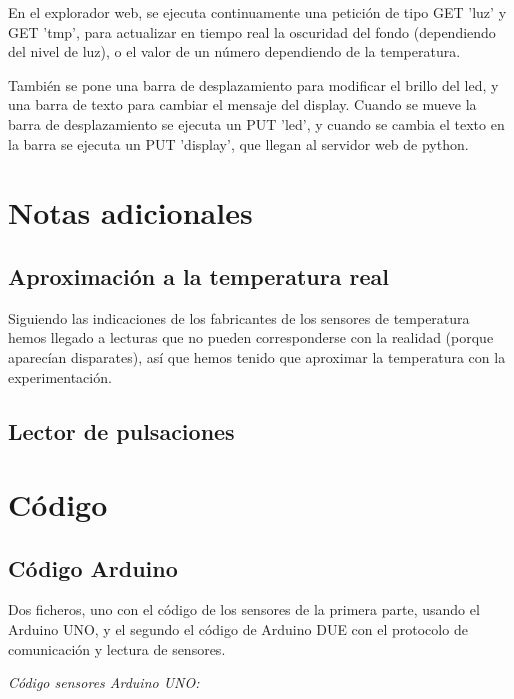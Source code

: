 \documentclass[]{article}
\begin{document}
En el explorador web, se ejecuta continuamente una petición de tipo GET 'luz' y GET 'tmp', para actualizar en tiempo real la oscuridad del fondo (dependiendo del nivel de luz), o el valor de un número dependiendo de la temperatura.

\hfill

También se pone una barra de desplazamiento para modificar el brillo del led, y una barra de texto para cambiar el mensaje del display. Cuando se mueve la barra de desplazamiento se ejecuta un PUT 'led', y cuando se cambia el texto en la barra se ejecuta un PUT 'display', que llegan al servidor web de python.



\section{Notas adicionales}

\subsection{Aproximación a la temperatura real}
Siguiendo las indicaciones de los fabricantes de los sensores de temperatura hemos llegado a lecturas que no pueden corresponderse con la realidad (porque aparecían disparates), así que hemos tenido que aproximar la temperatura con la experimentación.


\subsection{Lector de pulsaciones}

\section{Código}
\subsection{Código Arduino}

Dos ficheros, uno con el código de los sensores de la primera parte, usando el Arduino UNO, y el segundo el código de Arduino DUE con el protocolo de comunicación y lectura de sensores.


\textit{Código sensores Arduino UNO:}

\end{document}
